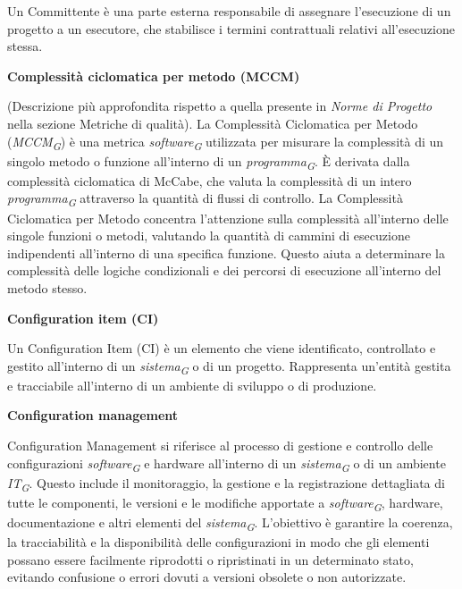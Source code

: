 \documentclass{article}
\begin{document}
Un Committente è una parte esterna responsabile di assegnare l'esecuzione di un progetto a un esecutore, che stabilisce i termini contrattuali relativi all'esecuzione stessa.

\vspace{0.4cm}

\textbf{Complessità ciclomatica per metodo (MCCM)}

\vspace{0.1cm}

(Descrizione più approfondita rispetto a quella presente in \textit{Norme di Progetto} nella sezione Metriche di qualità). La Complessità Ciclomatica per Metodo (\textit{MCCM}\textsubscript{\textit{G}}) è una metrica \textit{software}\textsubscript{\textit{G}} utilizzata per misurare la complessità di un singolo metodo o funzione all'interno di un \textit{programma}\textsubscript{\textit{G}}. È derivata dalla complessità ciclomatica di McCabe, che valuta la complessità di un intero \textit{programma}\textsubscript{\textit{G}} attraverso la quantità di flussi di controllo.
La Complessità Ciclomatica per Metodo concentra l'attenzione sulla complessità all'interno delle singole funzioni o metodi, valutando la quantità di cammini di esecuzione indipendenti all'interno di una specifica funzione. Questo aiuta a determinare la complessità delle logiche condizionali e dei percorsi di esecuzione all'interno del metodo stesso.

\vspace{0.4cm}

\textbf{Configuration item (CI)}

\vspace{0.1cm}

Un Configuration Item (CI) è un elemento che viene identificato, controllato e gestito all'interno di un \textit{sistema}\textsubscript{\textit{G}} o di un progetto. Rappresenta un'entità gestita e tracciabile all'interno di un ambiente di sviluppo o di produzione.

\vspace{0.4cm}

\textbf{Configuration management}

\vspace{0.1cm}

Configuration Management si riferisce al processo di gestione e controllo delle configurazioni \textit{software}\textsubscript{\textit{G}} e hardware all'interno di un \textit{sistema}\textsubscript{\textit{G}} o di un ambiente \textit{IT}\textsubscript{\textit{G}}. Questo include il monitoraggio, la gestione e la registrazione dettagliata di tutte le componenti, le versioni e le modifiche apportate a \textit{software}\textsubscript{\textit{G}}, hardware, documentazione e altri elementi del \textit{sistema}\textsubscript{\textit{G}}. L'obiettivo è garantire la coerenza, la tracciabilità e la disponibilità delle configurazioni in modo che gli elementi possano essere facilmente riprodotti o ripristinati in un determinato stato, evitando confusione o errori dovuti a versioni obsolete o non autorizzate.
\end{document}

